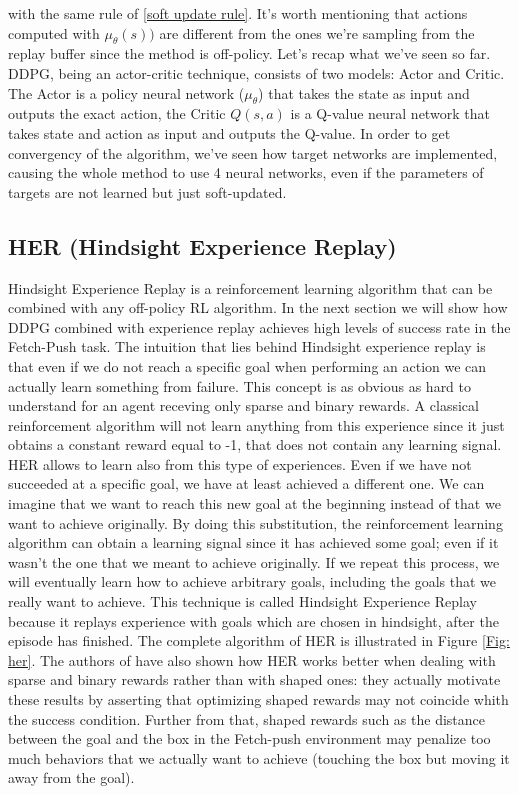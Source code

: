 \documentclass[a4paper]{report}
\begin{document}
with the same rule of \ref{soft update rule}. It's worth mentioning that actions computed with $\mu_{\theta}(s))$ are different from the ones we're sampling from the replay buffer since the method is off-policy. Let's recap what we've seen so far. DDPG, being an actor-critic technique, consists of two models: Actor and Critic. The Actor is a policy neural network ($\mu_{\theta} $) that takes the state as input and outputs the exact action, the Critic $Q(s,a)$ is a Q-value neural network that takes state and action as input and outputs the Q-value. In order to get convergency of the algorithm, we've seen how target networks are implemented, causing the whole method to use 4 neural networks, even if the parameters of targets are not learned but just soft-updated.






\subsection{HER (Hindsight Experience Replay)}
Hindsight Experience Replay is a reinforcement learning algorithm that can be combined with any off-policy RL algorithm. In the next section we will show how DDPG combined with experience replay achieves high levels of success rate in the Fetch-Push task. The intuition that lies behind Hindsight experience replay is that even if we do not reach a specific goal when performing an action we can actually learn something from failure. This concept is as obvious as hard to understand for an agent receving only sparse and binary rewards. 
 A classical reinforcement algorithm will not learn anything from this experience since it just obtains a constant reward equal to -1, that does not contain any learning signal. HER allows to learn also from this type of experiences. Even if we have not succeeded at a specific goal, we have at least achieved a different one. We can imagine that we want to reach this new goal at the beginning instead of that we want to achieve originally. By doing this substitution, the reinforcement learning algorithm can obtain a learning signal since it has achieved some goal; even if it wasn't the one that we meant to achieve originally. If we repeat this process, we will eventually learn how to achieve arbitrary goals, including the goals that we really want to achieve. This technique is called Hindsight Experience Replay because it replays experience with goals which are chosen in hindsight, after the episode has finished. The complete algorithm of HER is illustrated in Figure \ref{Fig: her}. The authors of \cite{her} have also shown how HER works better when dealing with sparse and binary rewards rather than with shaped ones: they actually motivate these results by asserting that optimizing shaped rewards may not coincide whith the success condition. Further from that, shaped rewards such as the distance between the goal and the box in the Fetch-push environment may penalize too much behaviors that we actually want to achieve (touching the box but moving it away from the goal).
\end{document}
